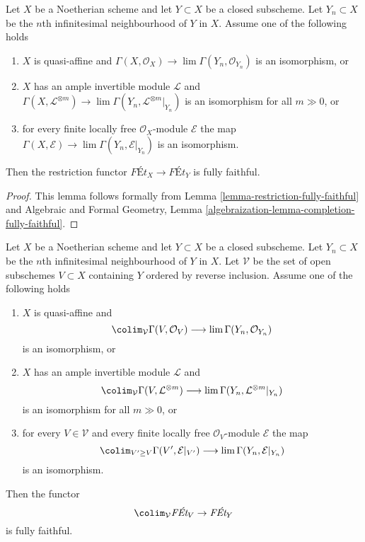 \begin{lemma}
\label{lemma-restriction-fully-faithful-special}
Let $X$ be a Noetherian scheme and let $Y \subset X$ be a closed subscheme.
Let $Y_n \subset X$ be the $n$th infinitesimal neighbourhood of $Y$ in $X$.
Assume one of the following holds
\begin{enumerate}
\item $X$ is quasi-affine and
$\Gamma(X, \mathcal{O}_X) \to \lim \Gamma(Y_n, \mathcal{O}_{Y_n})$
is an isomorphism, or
\item $X$ has an ample invertible module $\mathcal{L}$ and
$\Gamma(X, \mathcal{L}^{\otimes m}) \to
\lim \Gamma(Y_n, \mathcal{L}^{\otimes m}|_{Y_n})$
is an isomorphism for all $m \gg 0$, or
\item for every finite locally free $\mathcal{O}_X$-module
$\mathcal{E}$ the map
$\Gamma(X, \mathcal{E}) \to \lim \Gamma(Y_n, \mathcal{E}|_{Y_n})$
is an isomorphism.
\end{enumerate}
Then the restriction functor $\textit{F\'Et}_X \to \textit{F\'Et}_Y$
is fully faithful.
\end{lemma}

\begin{proof}
This lemma follows formally from
Lemma \ref{lemma-restriction-fully-faithful} and
Algebraic and Formal Geometry, Lemma
\ref{algebraization-lemma-completion-fully-faithful}.
\end{proof}

\begin{lemma}
\label{lemma-restriction-fully-faithful-general-special}
Let $X$ be a Noetherian scheme and let $Y \subset X$ be a closed subscheme.
Let $Y_n \subset X$ be the $n$th infinitesimal neighbourhood of $Y$ in $X$.
Let $\mathcal{V}$ be the set of open subschemes $V \subset X$ containing $Y$
ordered by reverse inclusion. Assume one of the following holds
\begin{enumerate}
\item $X$ is quasi-affine and
$$
\colim_\mathcal{V} \Gamma(V, \mathcal{O}_V)
\longrightarrow
\lim \Gamma(Y_n, \mathcal{O}_{Y_n})
$$
is an isomorphism, or
\item $X$ has an ample invertible module $\mathcal{L}$ and
$$
\colim_\mathcal{V} \Gamma(V, \mathcal{L}^{\otimes m})
\longrightarrow
\lim \Gamma(Y_n, \mathcal{L}^{\otimes m}|_{Y_n})
$$
is an isomorphism for all $m \gg 0$, or
\item for every $V \in \mathcal{V}$ and every finite locally free
$\mathcal{O}_V$-module $\mathcal{E}$ the map
$$
\colim_{V' \geq V} \Gamma(V', \mathcal{E}|_{V'})
\longrightarrow
\lim \Gamma(Y_n, \mathcal{E}|_{Y_n})
$$
is an isomorphism.
\end{enumerate}
Then the functor
$$
\colim_\mathcal{V} \textit{F\'Et}_V \to \textit{F\'Et}_Y
$$
is fully faithful.
\end{lemma}

